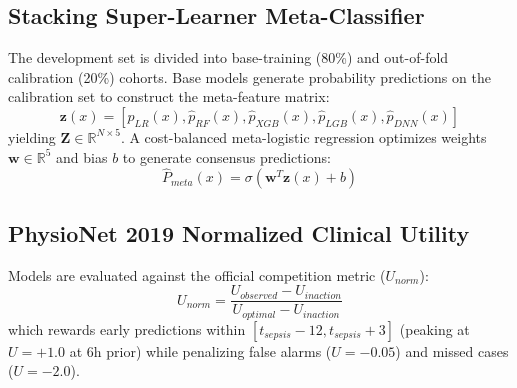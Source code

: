 \documentclass[conference]{IEEEtran}
\begin{document}
\subsection{Stacking Super-Learner Meta-Classifier}
The development set is divided into base-training (80\%) and out-of-fold calibration (20\%) cohorts. Base models generate probability predictions on the calibration set to construct the meta-feature matrix:
\begin{equation}
\mathbf{z}(x) = [\hat{p}_{LR}(x), \hat{p}_{RF}(x), \hat{p}_{XGB}(x), \hat{p}_{LGB}(x), \hat{p}_{DNN}(x)]
\end{equation}
yielding $\mathbf{Z} \in \mathbb{R}^{N \times 5}$. A cost-balanced meta-logistic regression optimizes weights $\mathbf{w} \in \mathbb{R}^5$ and bias $b$ to generate consensus predictions:
\begin{equation}
\hat{P}_{meta}(x) = \sigma(\mathbf{w}^T \mathbf{z}(x) + b)
\end{equation}

\subsection{PhysioNet 2019 Normalized Clinical Utility}
Models are evaluated against the official competition metric ($U_{norm}$):
\begin{equation}
U_{norm} = \frac{U_{observed} - U_{inaction}}{U_{optimal} - U_{inaction}}
\end{equation}
which rewards early predictions within $[t_{sepsis}-12, t_{sepsis}+3]$ (peaking at $U = +1.0$ at 6h prior) while penalizing false alarms ($U = -0.05$) and missed cases ($U = -2.0$).
\end{document}
